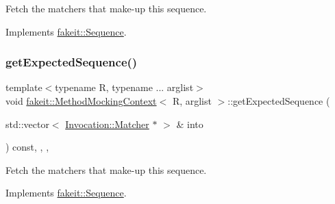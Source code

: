 Fetch the matchers that make-\/up this sequence. 



Implements \mbox{\hyperlink{classfakeit_1_1Sequence_aa1a1e4ad2fcac3379ba38f250bf06884}{fakeit\+::\+Sequence}}.

\mbox{\label{classfakeit_1_1MethodMockingContext_ab88d912b17801968fab8443079e2eabc}} 
\subsubsection{\texorpdfstring{getExpectedSequence()}{getExpectedSequence()}\hspace{0.1cm}{\footnotesize\ttfamily [4/9]}}
{\footnotesize\ttfamily template$<$typename R, typename ... arglist$>$ \\
void \mbox{\hyperlink{classfakeit_1_1MethodMockingContext}{fakeit\+::\+Method\+Mocking\+Context}}$<$ R, arglist $>$\+::get\+Expected\+Sequence (\begin{DoxyParamCaption}\item[{std\+::vector$<$ \mbox{\hyperlink{structfakeit_1_1Invocation_1_1Matcher}{Invocation\+::\+Matcher}} $\ast$ $>$ \&}]{into }\end{DoxyParamCaption}) const\hspace{0.3cm}{\ttfamily [inline]}, {\ttfamily [override]}, {\ttfamily [protected]}, {\ttfamily [virtual]}}



Fetch the matchers that make-\/up this sequence. 



Implements \mbox{\hyperlink{classfakeit_1_1Sequence_aa1a1e4ad2fcac3379ba38f250bf06884}{fakeit\+::\+Sequence}}.

\mbox{\label{classfakeit_1_1MethodMockingContext_ab88d912b17801968fab8443079e2eabc}} 
